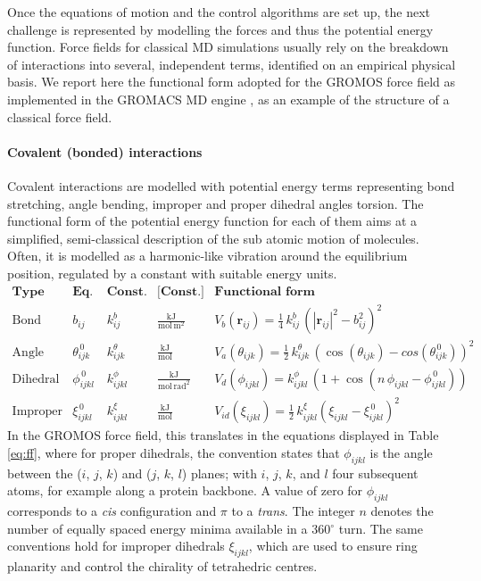Once the equations of motion and the control algorithms are set up, the next challenge is represented by modelling the forces and thus the potential energy function.
%
Force fields for classical MD simulations usually rely on the breakdown of interactions into several, independent terms, identified on an empirical physical basis. We report here the functional form adopted for the GROMOS force field \cite{Oostenbrink2004,Schmid2011} as implemented in the GROMACS MD engine \cite{Berendsen1995,Abraham2015,gromacs_man}, as an example of the structure of a classical force field.

\paragraph{Covalent (bonded) interactions} Covalent interactions are modelled with potential energy terms representing bond stretching, angle bending, improper and proper dihedral angles torsion. 
%
The functional form of the potential energy function for each of them aims at a simplified, semi-classical description of the sub atomic motion of molecules. Often, it is modelled as a harmonic-like vibration around the equilibrium position, regulated by a constant with suitable energy units.
%
\begin{equation} \label{eq:ff}
\begin{array}{lcccl}
\textbf{Type} & \textbf{Eq. pos.} & \textbf{Const.} & \textbf{[Const.]} & \textbf{Functional form} \\
\hline 
  \text{Bond} & b_{ij} & k^b_{ij} & \frac{\text{kJ}}{\text{mol}\,\text{m}^2} & V_b(\textbf{r}_{ij}) = \frac{1}{4}\,k^b_{ij}\,\left(|\textbf{r}_{ij}|^2 - b_{ij}^2\right)^2 \\ 
  \text{Angle} & \theta^{\, 0}_{ijk} & k^\theta_{ijk} & \frac{\text{kJ}}{\text{mol}}  & V_a(\theta_{ijk}) = \frac{1}{2}\,k^\theta_{ijk}\,\left(\cos\left(\theta_{ijk}\right) - cos\left(\theta^{\, 0}_{ijk}\right)\right)^2 \\
  \text{Dihedral} & \phi_{ijkl}^{\, 0} & k_{ijkl}^\phi & \frac{\text{kJ}}{\text{mol}\,\text{rad}^2}  & V_d(\phi_{ijkl}) = k_{ijkl}^\phi\,\left( 1 + \cos\left( n \, \phi_{ijkl} - \phi_{ijkl}^{\, 0} \right) \right) \\
  \text{Improper} & \xi_{ijkl}^{\, 0} & k_{ijkl}^\xi & \frac{\text{kJ}}{\text{mol}}  & V_{id} (\xi_{ijkl}) = \frac{1}{2}\,k_{ijkl}^\xi \left( \xi_{ijkl} - \xi_{ijkl}^{\, 0} \right)^2
 \end{array}
\end{equation}
In the GROMOS force field, this translates in the equations displayed in Table \ref{eq:ff}, where for proper dihedrals, the convention states that $\phi_{ijkl}$ is the angle between the ($i$, $j$, $k$) and ($j$, $k$, $l$) planes; with $i$, $j$, $k$, and $l$ four subsequent atoms, for example along a protein backbone. A value of zero for $\phi_{ijkl}$ corresponds to a \textit{cis} configuration and $\pi$ to a \emph{trans}. The integer $n$ denotes the number of equally spaced energy minima available in a 360$^\circ$ turn.
%
The same conventions hold for improper dihedrals $\xi_{ijkl}$, which are used to ensure ring planarity and control the chirality of tetrahedric centres.


